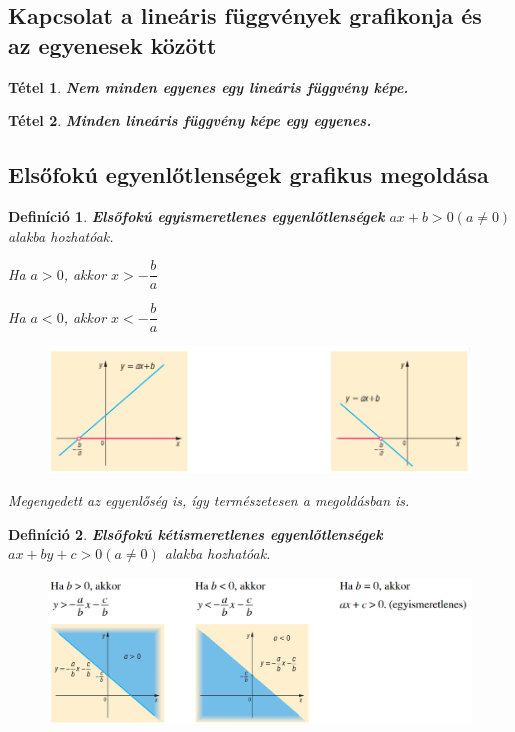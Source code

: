 \documentclass[12pt,a4paper]{article}
\newtheorem{theorem}{Tétel} [section]
\newtheorem{definition}{Definíció} [section]
\begin{document}
\subsection{Kapcsolat a lineáris függvények grafikonja és az egyenesek között}

\begin{theorem}
\textbf{Nem minden egyenes egy lineáris függvény képe.}
\end{theorem}


\begin{theorem}
\textbf{Minden lineáris függvény képe egy egyenes.}
\end{theorem}
\newpage
\subsection{Elsőfokú egyenlőtlenségek grafikus megoldása}

\begin{definition}
\textbf{Elsőfokú egyismeretlenes egyenlőtlenségek} $ax+b>0 (a\neq 0)$ alakba hozhatóak.

Ha $a>0$, akkor $x>-\dfrac{b}{a}$

Ha $a<0$, akkor $x<-\dfrac{b}{a}$

\begin{figure}[h!]
\centering
\includegraphics[scale=0.4]{geometry/lin_egyenlotlenseg}
\end{figure}

Megengedett az egyenlőség is, így természetesen a megoldásban is.
\end{definition}

\begin{definition}
\textbf{Elsőfokú kétismeretlenes egyenlőtlenségek} $ax+by+c>0 (a\neq 0)$ alakba hozhatóak.
\begin{figure}[h!]
\centering
\includegraphics[width=\textwidth]{geometry/lin_egyenlotlenseg2}
\end{figure}
\end{definition}
\end{document}
